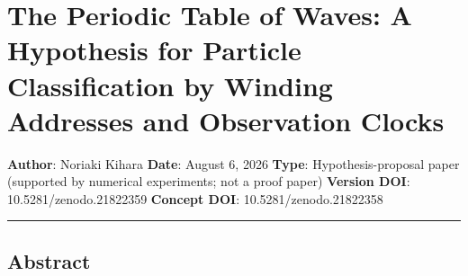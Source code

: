 \documentclass[
]{article}
\author{}
\date{}
\begin{document}
\section{The Periodic Table of Waves: A Hypothesis for Particle
Classification by Winding Addresses and Observation
Clocks}\label{the-periodic-table-of-waves-a-hypothesis-for-particle-classification-by-winding-addresses-and-observation-clocks}

\textbf{Author}: Noriaki Kihara \textbf{Date}: August 6, 2026
\textbf{Type}: Hypothesis-proposal paper (supported by numerical
experiments; not a proof paper) \textbf{Version DOI}:
10.5281/zenodo.21822359 \textbf{Concept DOI}: 10.5281/zenodo.21822358

\begin{center}\rule{0.5\linewidth}{0.5pt}\end{center}

\subsection{Abstract}\label{abstract}
\end{document}
